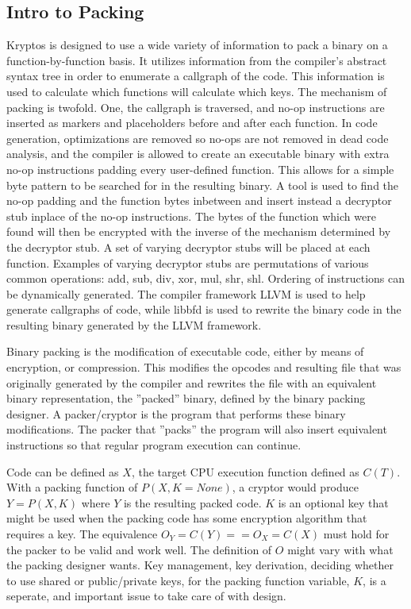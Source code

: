 \documentclass{article}
\begin{document}
\subsection{Intro to Packing}
Kryptos is designed to use a wide variety of information to pack a binary on a function-by-function basis. It utilizes information from the compiler's abstract syntax tree in order to enumerate a callgraph of the code. This information is used to calculate which functions will calculate which keys. The mechanism of packing is twofold. One, the callgraph is traversed, and no-op instructions are inserted as markers and placeholders before and after each function. In code generation, optimizations are removed so no-ops are not removed in dead code analysis, and the compiler is allowed to create an executable binary with extra no-op instructions padding every user-defined function. This allows for a simple byte pattern to be searched for in the resulting binary. A tool is used to find the no-op padding and the function bytes inbetween and insert instead a decryptor stub inplace of the no-op instructions. The bytes of the function which were found will then be encrypted with the inverse of the mechanism determined by the decryptor stub. A set of varying decryptor stubs will be placed at each function. Examples of varying decryptor stubs are permutations of various common operations: add, sub, div, xor, mul, shr, shl. Ordering of instructions can be dynamically generated. The compiler framework LLVM is used to help generate callgraphs of code, while libbfd is used to rewrite the binary code in the resulting binary generated by the LLVM framework.

Binary packing is the modification of executable code, either by means of encryption, or compression. This modifies the opcodes and resulting file that was originally generated by the compiler and rewrites the file with an equivalent binary representation, the ''packed'' binary, defined by the binary packing designer. A packer/cryptor is the program that performs these binary modifications. The packer that ''packs'' the program will also insert equivalent instructions so that regular program execution can continue. \newline

Code can be defined as $X$,  the target CPU execution function defined as $C(T)$. With a packing function of $P(X, K=None)$, a cryptor would produce $Y = P(X, K)$ where $Y$ is the resulting packed code. $K$ is an optional key that might be used when the packing code has some encryption algorithm that requires a key. The equivalence $O_Y = C(Y) == O_X = C(X)$ must hold for the packer to be valid and work well. The definition of $O$ might vary with what the packing designer wants. Key management, key derivation, deciding whether to use shared or public/private keys, for the packing function variable, $K$, is a seperate, and important issue to take care of with design. \newline
\end{document}
